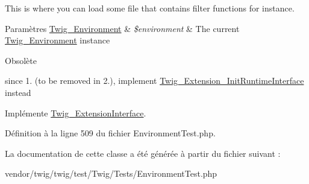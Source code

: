 This is where you can load some file that contains filter functions for instance.


\begin{DoxyParams}[1]{Paramètres}
\hyperlink{class_twig___environment}{Twig\+\_\+\+Environment} & {\em \$environment} & The current \hyperlink{class_twig___environment}{Twig\+\_\+\+Environment} instance\\
\hline
\end{DoxyParams}
\begin{DoxyRefDesc}{Obsolète}
\item[\hyperlink{deprecated__deprecated000015}{Obsolète}]since 1. (to be removed in 2.), implement \hyperlink{interface_twig___extension___init_runtime_interface}{Twig\+\_\+\+Extension\+\_\+\+Init\+Runtime\+Interface} instead \end{DoxyRefDesc}


Implémente \hyperlink{interface_twig___extension_interface_ab17a2e5ce3e5789febe1f3a96e61ec38}{Twig\+\_\+\+Extension\+Interface}.



Définition à la ligne 509 du fichier Environment\+Test.\+php.



La documentation de cette classe a été générée à partir du fichier suivant \+:\begin{DoxyCompactItemize}
\item 
vendor/twig/twig/test/\+Twig/\+Tests/Environment\+Test.\+php\end{DoxyCompactItemize}
